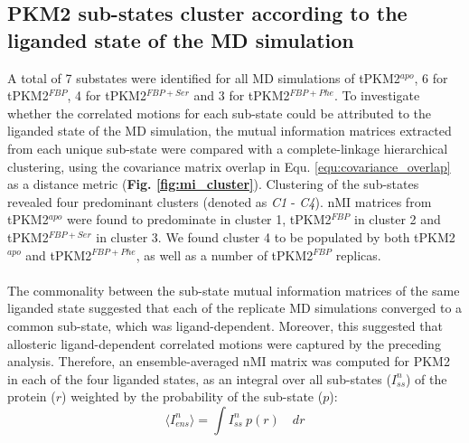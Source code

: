\subsection{PKM2 sub-states cluster according to the liganded state of the MD simulation}
A total of 7 substates were identified for all MD simulations of tPKM2$^{apo}$, 6 for tPKM2$^{FBP}$, 4 for tPKM2$^{FBP+Ser}$ and 3 for tPKM2$^{FBP+Phe}$. To investigate whether the correlated motions for each sub-state could be attributed to the liganded state of the MD simulation, the mutual information matrices extracted from each unique sub-state were compared with a complete-linkage hierarchical clustering, using the covariance matrix overlap in Equ. \ref{equ:covariance_overlap} as a distance metric (\textbf{Fig. \ref{fig:mi_cluster}}). Clustering of the sub-states revealed four predominant clusters (denoted as \textit{C1} - \textit{C4}). nMI matrices from tPKM2$^{apo}$ were found to predominate in cluster 1, tPKM2$^{FBP}$ in cluster 2 and tPKM2$^{FBP+Ser}$ in cluster 3. We found cluster 4 to be populated by both tPKM2$^{apo}$ and tPKM2$^{FBP+Phe}$, as well as a number of tPKM2$^{FBP}$ replicas.
%
%
\\\\
%
%
The commonality between the sub-state mutual information matrices of the same liganded state suggested that each of the replicate MD simulations converged to a common sub-state, which was ligand-dependent. Moreover, this suggested that allosteric ligand-dependent correlated motions were captured by the preceding analysis. Therefore, an ensemble-averaged nMI matrix was computed for PKM2 in each of the four liganded states, as an integral over all sub-states ($I^{n}_{ss}$) of the protein ($r$) weighted by the probability of the sub-state ($p$):
%
%
\begin{equation}
\langle I^{n}_{ens} \rangle = \int I^{n}_{ss} \: p(r) \quad dr
\end{equation}
%
%
%
%
%
